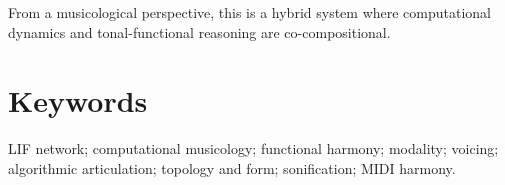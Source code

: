 \documentclass[11pt,a4paper]{article}
\begin{document}
From a musicological perspective, this is a hybrid system where
computational dynamics and tonal-functional reasoning are co-compositional.

\section*{Keywords}

LIF network; computational musicology; functional harmony; modality; voicing;
algorithmic articulation; topology and form; sonification; MIDI harmony.
\end{document}
